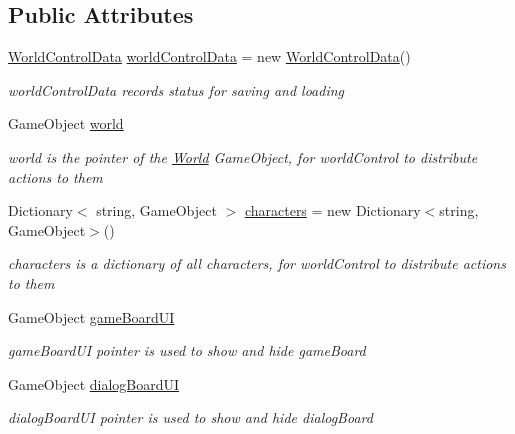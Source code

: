 \subsection*{Public Attributes}
\begin{DoxyCompactItemize}
\item 
\hyperlink{classdoki_unity_1_1_world_control_data}{World\+Control\+Data} \hyperlink{classdoki_unity_1_1_world_control_ae4d88d77b7d39fb0dda5ffa4dbf2e2af}{world\+Control\+Data} = new \hyperlink{classdoki_unity_1_1_world_control_data}{World\+Control\+Data}()
\begin{DoxyCompactList}\small\item\em world\+Control\+Data records status for saving and loading \end{DoxyCompactList}\item 
Game\+Object \hyperlink{classdoki_unity_1_1_world_control_ad0c8093d2369420fe7a2945685569943}{world}
\begin{DoxyCompactList}\small\item\em world is the pointer of the \hyperlink{classdoki_unity_1_1_world}{World} Game\+Object, for world\+Control to distribute actions to them \end{DoxyCompactList}\item 
Dictionary$<$ string, Game\+Object $>$ \hyperlink{classdoki_unity_1_1_world_control_ac9f5d3a5d09d2ebb06d329ca35c7c6c1}{characters} = new Dictionary$<$string, Game\+Object$>$()
\begin{DoxyCompactList}\small\item\em characters is a dictionary of all characters, for world\+Control to distribute actions to them \end{DoxyCompactList}\item 
Game\+Object \hyperlink{classdoki_unity_1_1_world_control_ae8c5b33906c63ababdf909c53fb9065f}{game\+Board\+UI}
\begin{DoxyCompactList}\small\item\em game\+Board\+UI pointer is used to show and hide game\+Board \end{DoxyCompactList}\item 
Game\+Object \hyperlink{classdoki_unity_1_1_world_control_a59c87f26e0e71d252a213a33d5fab725}{dialog\+Board\+UI}
\begin{DoxyCompactList}\small\item\em dialog\+Board\+UI pointer is used to show and hide dialog\+Board \end{DoxyCompactList}\item 

\end{DoxyCompactItemize}
